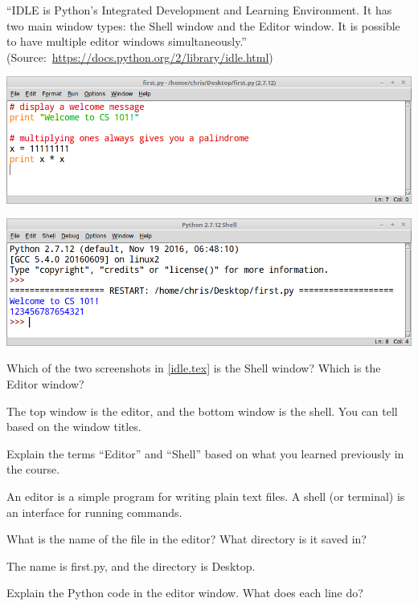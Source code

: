 
``IDLE is Python's Integrated Development and Learning Environment.
It has two main window types: the Shell window and the Editor window.
It is possible to have multiple editor windows simultaneously.''
(Source:~\url{https://docs.python.org/2/library/idle.html})

\bigskip
\includegraphics[width=0.8\linewidth]{idle-editor.png}

\bigskip
\hfill \includegraphics[width=0.8\linewidth]{idle-shell.png}




\Q Which of the two screenshots in \ref{idle.tex} is the Shell window?
Which is the Editor window?

\begin{answer}
The top window is the editor, and the bottom window is the shell.
You can tell based on the window titles.
\end{answer}


\Q Explain the terms ``Editor'' and ``Shell'' based on what you learned previously in the course.

\begin{answer}
An editor is a simple program for writing plain text files.
A shell (or terminal) is an interface for running commands.
\end{answer}


\Q What is the name of the file in the editor? What directory is it saved in?

\begin{answer}
The name is first.py, and the directory is Desktop.
\end{answer}


\Q Explain the Python code in the editor window. What does each line do?

